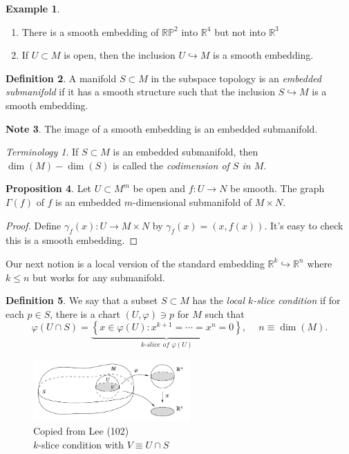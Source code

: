\documentclass[10pt,letterpaper,cm]{nupset}
\theoremstyle{definition}
\newtheorem{definition}{Definition}[subsection]
\newtheorem{exmp}[definition]{Example}
\newtheorem{note}[definition]{Note}
\theoremstyle{theorem}
\newtheorem{prop}[definition]{Proposition}
\theoremstyle{remark}
\newtheorem*{term}{Terminology}
\newcommand{\R}{\mathbb R}
\newcommand{\RP}{\mathbb{RP}}
\newcommand{\1}{\mathbf{1}}
\newcommand{\0}{\vec 0}
\begin{document}
\begin{exmp} $ $
\begin{enumerate}
\item There is a smooth embedding of $\RP^2$ into $\R^4$ but not into $\R^3$
\item If $U \subset M$ is open, then the inclusion $U \hookrightarrow M$ is a smooth embedding.
\end{enumerate}
\end{exmp}

\begin{definition}
A manifold $ S\subset M$ in the subspace topology is an \textit{embedded submanifold} if it has a smooth structure such that the inclusion $S \hookrightarrow M$ is a smooth embedding.
\end{definition}

\begin{note}
The image of a smooth embedding is an embedded submanifold.
\end{note}

\begin{term}
If $S \subset M$ is an embedded submanifold, then $\dim(M) - \dim(S)$ is called the \textit{codimension of $S$ in $M$}.
\end{term}

\begin{prop}
Let $U \subset M^m$ be open and $f: U \to N$ be smooth. The graph $\Gamma(f)$ of $f$ is an embedded $m$-dimensional submanifold of $M \times N$.
\end{prop}
\begin{proof}
Define $\gamma_f(x) : U \to M \times N$ by $\gamma_f(x) = \left(x, f(x)\right)$. It's easy to check this is a smooth embedding.
\end{proof}

\medskip

Our next notion is a local version of the standard embedding $\R^k \hookrightarrow \R^n$ where $k\leq n$ but works for any submanifold.

\begin{definition}
We say that a subset $S\subset M$ has the \textit{local $k$-slice condition} if for each $p\in S$, there is a chart $(U, \varphi)\ni p$ for $M$ such that $$\varphi(U \cap S) = \underbrace{\left\{x\in \varphi(U) : x^{k+1} = \cdots = x^n = 0\right\}}_{k\textit{-slice of }\varphi(U)}, \ \quad n \equiv \dim(M). $$ 

\begin{figure}[h]
\centering
\includegraphics[width=60mm]{slice.png}
\caption[Copied from Lee (102); $k$-slice condition with $V\equiv U \cap S$]
{Copied from Lee (102) \\ $k$-slice condition with $V\equiv U \cap S$\endtabular}
\end{figure}
\end{definition}
\end{document}
